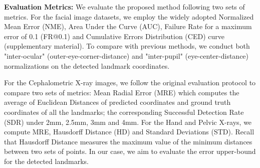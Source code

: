 \documentclass[runningheads]{llncs}
\begin{document}
\textbf{Evaluation Metrics:} We evaluate the proposed method following two sets of metrics. For the facial image datasets, we employ the widely adopted Normalized Mean Error (NME), Area Under the Curve (AUC), Failure Rate for a maximum error of 0.1 (FR@0.1) and Cumulative Errors Distribution (CED) curve (supplementary material). To compare with previous methods, we conduct both "inter-ocular" (outer-eye-corner-distance) and "inter-pupil" (eye-center-distance) normalizations on the detected landmark coordinates.

For the Cephalometric X-ray images, we follow the original evaluation protocol to compare two sets of metrics: Mean Radial Error (MRE) which computes the average of Euclidean Distances of predicted coordinates and ground truth coordinates of all the landmarks; the corresponding Successful Detection Rate (SDR) under 2mm, 2.5mm, 3mm and 4mm. For the Hand and Pelvic X-rays, we compute MRE, Hausdorff Distance (HD) and Standard Deviations (STD). Recall that Hausdorff Distance measures the maximum value of the minimum distances between two sets of points. In our case, we aim to evaluate the error upper-bound for the detected landmarks.
\end{document}

